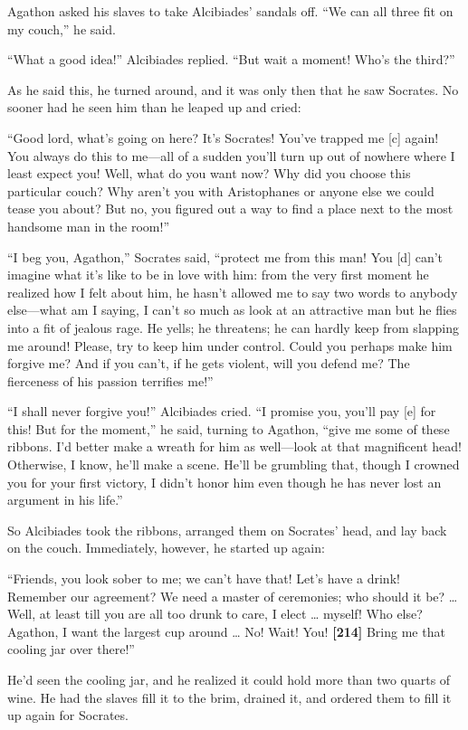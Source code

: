 Agathon asked his slaves to take Alcibiades' sandals off. “We can all
three fit on my couch,” he said.

“What a good idea!” Alcibiades replied. “But wait a moment! Who's the
third?”

As he said this, he turned around, and it was only then that he saw
Socrates. No sooner had he seen him than he leaped up and cried:

“Good lord, what's going on here? It's Socrates! You've trapped me
{[}c{]} again! You always do this to me---all of a sudden you'll turn up
out of nowhere where I least expect you! Well, what do you want now? Why
did you choose this particular couch? Why aren't you with Aristophanes
or anyone else we could tease you about? But no, you figured out a way
to find a place next to the most handsome man in the room!”

“I beg you, Agathon,” Socrates said, “protect me from this man! You
{[}d{]} can't imagine what it's like to be in love with him: from the
very first moment he realized how I felt about him, he hasn't allowed me
to say two words to anybody else---what am I saying, I can't so much as
look at an attractive man but he flies into a fit of jealous rage. He
yells; he threatens; he can hardly keep from slapping me around! Please,
try to keep him under control. Could you perhaps make him forgive me?
And if you can't, if he gets violent, will you defend me? The fierceness
of his passion terrifies me!”

“I shall never forgive you!” Alcibiades cried. “I promise you, you'll
pay {[}e{]} for this! But for the moment,” he said, turning to Agathon,
“give me some of these ribbons. I'd better make a wreath for him as
well---look at that magnificent head! Otherwise, I know, he'll make a
scene. He'll be grumbling that, though I crowned you for your first
victory, I didn't honor him even though he has never lost an argument in
his life.”

So Alcibiades took the ribbons, arranged them on Socrates' head, and lay
back on the couch. Immediately, however, he started up again:

“Friends, you look sober to me; we can't have that! Let's have a drink!
Remember our agreement? We need a master of ceremonies; who should it
be? \ldots{} Well, at least till you are all too drunk to care, I elect
\ldots{} myself! Who else? Agathon, I want the largest cup around
\ldots{} No! Wait! You! {\bf {[}214{]}} Bring me that cooling jar over
there!”

He'd seen the cooling jar, and he realized it could hold more than two
quarts of wine. He had the slaves fill it to the brim, drained it, and
ordered them to fill it up again for Socrates.

